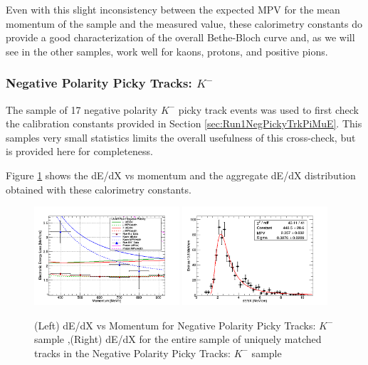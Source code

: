 Even with this slight inconsistency between the expected MPV for the mean momentum of the sample and the measured value, these calorimetry constants do provide a good characterization of the overall Bethe-Bloch curve and, as we will see in the other samples, work well for kaons, protons, and positive pions.

\subsubsection{Negative Polarity Picky Tracks: $K^{-}$}\label{sec:Run1NegPickyTrkKaonMinus}
The sample of 17 negative polarity $K^{-}$ picky track events was used to first check the calibration constants provided in Section \ref{sec:Run1NegPickyTrkPiMuE}. This samples very small statistics limits the overall usefulness of this cross-check, but is provided here for completeness.

Figure \ref{fig:Run1NegPickyTrkKaonResults} shows the dE/dX vs momentum and the aggregate dE/dX distribution obtained with these calorimetry constants.

\begin{figure}[htb]
\centering
\includegraphics[width=0.48\textwidth]{images/dEdXvsMomentumNegPolRun1Kaon.png}
\includegraphics[width=0.48\textwidth]{images/dEdXKaonRunINegPol.png}
\caption{(Left) dE/dX vs Momentum for Negative Polarity Picky Tracks: $K^{-}$ sample ,(Right) dE/dX for the entire sample of uniquely matched tracks in the Negative Polarity Picky Tracks: $K^{-}$ sample }
\label{fig:Run1NegPickyTrkKaonResults}
\end{figure}

